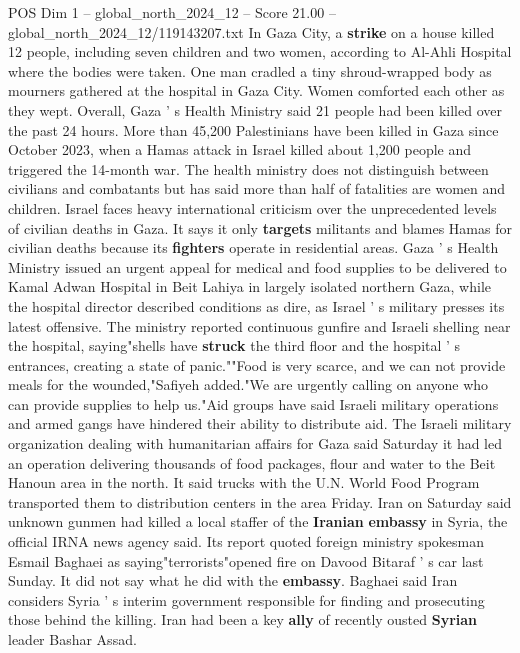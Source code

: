 \begin{textsample}{POS Dim 1 – global\_north\_2024\_12 – Score 21.00 – global\_north\_2024\_12/119143207.txt}
In Gaza City, a \textbf{strike} on a house killed 12 people, including seven children and two women, according to Al-Ahli Hospital where the bodies were taken.
One man cradled a tiny shroud-wrapped body as mourners gathered at the hospital in Gaza City.
Women comforted each other as they wept.
Overall, Gaza ' s Health Ministry said 21 people had been killed over the past 24 hours.
More than 45,200 Palestinians have been killed in Gaza since October 2023, when a Hamas attack in Israel killed about 1,200 people and triggered the 14-month war.
The health ministry does not distinguish between civilians and combatants but has said more than half of fatalities are women and children.
Israel faces heavy international criticism over the unprecedented levels of civilian deaths in Gaza.
It says it only \textbf{targets} militants and blames Hamas for civilian deaths because its \textbf{fighters} operate in residential areas.
Gaza ' s Health Ministry issued an urgent appeal for medical and food supplies to be delivered to Kamal Adwan Hospital in Beit Lahiya in largely isolated northern Gaza, while the hospital director described conditions as dire, as Israel ' s military presses its latest offensive.
The ministry reported continuous gunfire and Israeli shelling near the hospital, saying"shells have \textbf{struck} the third floor and the hospital ' s entrances, creating a state of panic.""Food is very scarce, and we can not provide meals for the wounded,"Safiyeh added."We are urgently calling on anyone who can provide supplies to help us."Aid groups have said Israeli military operations and armed gangs have hindered their ability to distribute aid.
The Israeli military organization dealing with humanitarian affairs for Gaza said Saturday it had led an operation delivering thousands of food packages, flour and water to the Beit Hanoun area in the north.
It said trucks with the U.N.
World Food Program transported them to distribution centers in the area Friday.
Iran on Saturday said unknown gunmen had killed a local staffer of the \textbf{Iranian} \textbf{embassy} in Syria, the official IRNA news agency said.
Its report quoted foreign ministry spokesman Esmail Baghaei as saying"terrorists"opened fire on Davood Bitaraf ' s car last Sunday.
It did not say what he did with the \textbf{embassy}.
Baghaei said Iran considers Syria ' s interim government responsible for finding and prosecuting those behind the killing.
Iran had been a key \textbf{ally} of recently ousted \textbf{Syrian} leader Bashar Assad.

\end{textsample}
